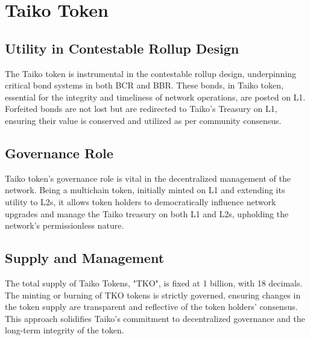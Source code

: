 \documentclass[twocolumn]{article}
\begin{document}
\section*{Taiko Token}

\subsection*{Utility in Contestable Rollup Design}
The Taiko token is instrumental in the contestable rollup design, underpinning critical bond systems in both BCR and BBR. These bonds, in Taiko token, essential for the integrity and timeliness of network operations, are posted on L1. Forfeited bonds are not lost but are redirected to Taiko's Treasury on L1, ensuring their value is conserved and utilized as per community consensus.

\subsection*{Governance Role}
Taiko token's governance role is vital in the decentralized management of the network. Being a multichain token, initially minted on L1 and extending its utility to L2s, it allows token holders to democratically influence network upgrades and manage the Taiko treasury on both L1 and L2s, upholding the network's permissionless nature.

\subsection*{Supply and Management}
The total supply of Taiko Tokens, "TKO", is fixed at 1 billion, with 18 decimals. The minting or burning of TKO tokens is strictly governed, ensuring changes in the token supply are transparent and reflective of the token holders' consensus. This approach solidifies Taiko's commitment to decentralized governance and the long-term integrity of the token.
\end{document}
